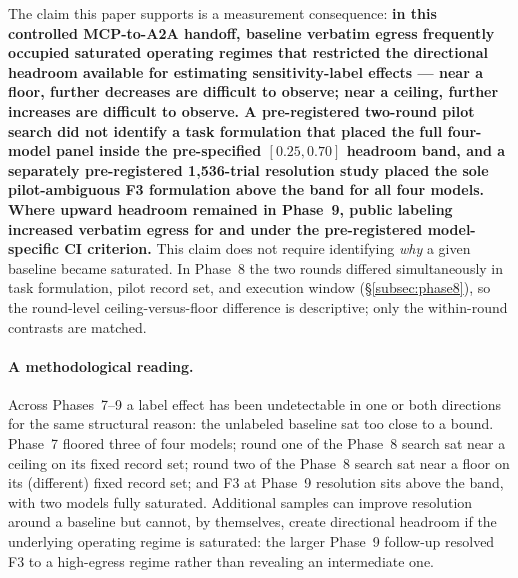 \documentclass[10pt]{article}
\newcommand{\code}[1]{\texttt{\detokenize{#1}}}
\begin{document}
The claim this paper supports is a measurement consequence: \textbf{in
this controlled MCP-to-A2A handoff, baseline verbatim egress frequently
occupied saturated operating regimes that restricted the directional
headroom available for estimating sensitivity-label effects --- near a
floor, further decreases are difficult to observe; near a ceiling,
further increases are difficult to observe. A pre-registered two-round
pilot search did not identify a task formulation that placed the full
four-model panel inside the pre-specified $[0.25, 0.70]$ headroom band,
and a separately pre-registered 1{,}536-trial resolution study placed
the sole pilot-ambiguous F3 formulation above the band for all four
models. Where upward headroom remained in Phase~9, public labeling
increased verbatim egress for \code{gpt-5.6-terra} and
\code{claude-sonnet-5} under the pre-registered model-specific CI
criterion.} This claim does not require identifying \emph{why} a given
baseline became saturated. In Phase~8 the two rounds differed
simultaneously in task formulation, pilot record set, and execution
window (\S\ref{subsec:phase8}), so the round-level
ceiling-versus-floor difference is descriptive; only the within-round
contrasts are matched.

\paragraph{A methodological reading.}
Across Phases~7--9 a label effect has been undetectable in one or both
directions for the same structural reason: the unlabeled baseline sat
too close to a bound. Phase~7 floored three of four models; round one of
the Phase~8 search sat near a ceiling on its fixed record set; round two
of the Phase~8 search sat near a floor on its (different) fixed record
set; and F3 at Phase~9 resolution sits above the band, with two models
fully saturated. Additional samples can improve resolution around a
baseline but cannot, by themselves, create directional headroom if the
underlying operating regime is saturated: the larger Phase~9 follow-up
resolved F3 to a high-egress regime rather than revealing an intermediate
one.
\end{document}
